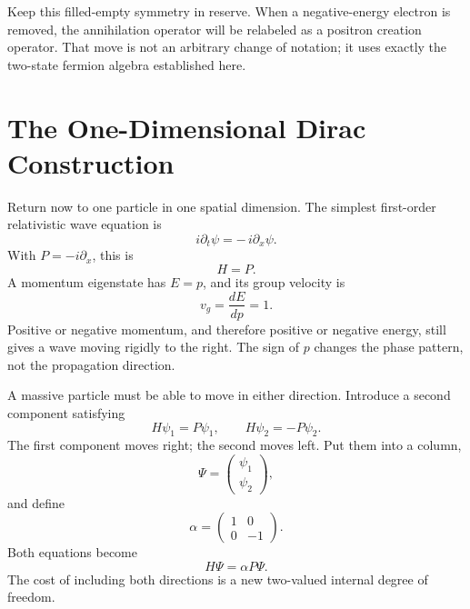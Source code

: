 Keep this filled-empty symmetry in reserve. When a negative-energy electron is removed, the annihilation operator will be relabeled as a positron creation operator. That move is not an arbitrary change of notation; it uses exactly the two-state fermion algebra established here.

\section{The One-Dimensional Dirac Construction}

Return now to one particle in one spatial dimension. The simplest first-order relativistic wave equation is
\begin{equation}
i\partial_t\psi=-\,i\partial_x\psi.
\label{eq:l10-right-mover}
\end{equation}
With \(P=-i\partial_x\), this is
\begin{equation}
H=P.
\end{equation}
A momentum eigenstate has \(E=p\), and its group velocity is
\begin{equation}
v_g=\frac{dE}{dp}=1.
\end{equation}
Positive or negative momentum, and therefore positive or negative energy, still gives a wave moving rigidly to the right. The sign of \(p\) changes the phase pattern, not the propagation direction.

A massive particle must be able to move in either direction. Introduce a second component satisfying
\begin{equation}
H\psi_1=P\psi_1,
\qquad
H\psi_2=-P\psi_2.
\label{eq:l10-two-directions}
\end{equation}
The first component moves right; the second moves left. Put them into a column,
\begin{equation}
\Psi=
\begin{pmatrix}
\psi_1\\
\psi_2
\end{pmatrix},
\end{equation}
and define
\begin{equation}
\alpha=
\begin{pmatrix}
1&0\\
0&-1
\end{pmatrix}.
\end{equation}
Both equations become
\begin{equation}
H\Psi=\alpha P\Psi.
\label{eq:l10-massless-one-d}
\end{equation}
The cost of including both directions is a new two-valued internal degree of freedom.

